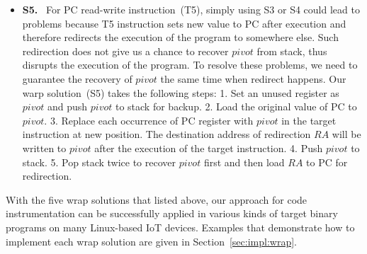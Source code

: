 \begin{itemize}
\item \textbf{S5. }~For PC read-write instruction~(T5), simply using S3 or S4 could lead to problems because T5 instruction sets new value to PC after execution and therefore redirects the execution of the program to somewhere else. Such redirection does not give us a chance to recover $pivot$ from stack, thus disrupts the execution of the program. To resolve these problems, we need to guarantee the recovery of $pivot$ the same time when redirect happens. Our warp solution~(S5) takes the following steps: 1. Set an unused register as $pivot$ and push $pivot$ to stack for backup. 2. Load the original value of PC to $pivot$. 3. Replace each occurrence of PC register with $pivot$ in the target instruction at new position. The destination address of redirection $RA$ will be written to $pivot$ after the execution of the target instruction. 4. Push $pivot$ to stack. 5. Pop stack twice to recover $pivot$ first and then load $RA$ to PC for redirection.
\end{itemize}

With the five wrap solutions that listed above, our approach for code instrumentation can be successfully applied in various kinds of target binary programs on many Linux-based IoT devices. Examples that demonstrate how to implement each wrap solution are given in Section~\ref{sec:impl:wrap}.
\vspace{5pt} 
%
%
%
%
